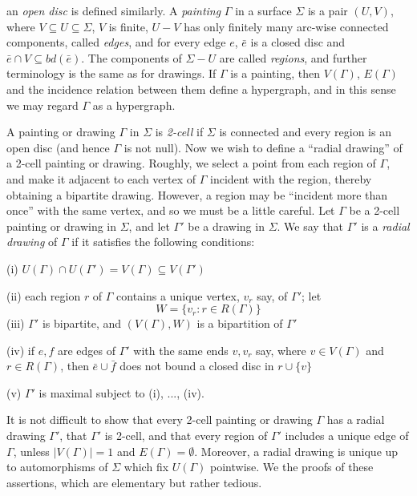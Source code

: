 \noindent an \textit{open disc} is defined similarly. A \textit{painting} $\Gamma$ in a surface $\Sigma$ is a pair $(U, V)$, where $V \subseteq U \subseteq \Sigma$, $V$ is finite, $U - V$ has only finitely many arc-wise connected components, called \textit{edges}, and for every edge $e$, $\bar{e}$ is a closed disc and $\bar{e} \cap V \subseteq bd(\bar{e})$. The components of $\Sigma - U$ are called \textit{regions}, and further terminology is the same as for drawings. If $\Gamma$ is a painting, then $V(\Gamma)$, $E(\Gamma)$ and the incidence relation between them define a hypergraph, and in this sense we may regard $\Gamma$ as a hypergraph.

A painting or drawing $\Gamma$ in $\Sigma$ is \textit{2-cell} if $\Sigma$ is connected and every region is an open disc (and hence $\Gamma$ is not null). Now we wish to define a ``radial drawing'' of a 2-cell painting or drawing. Roughly, we select a point from each region of $\Gamma$, and make it adjacent to each vertex of $\Gamma$ incident with the region, thereby obtaining a bipartite drawing. However, a region may be ``incident more than once'' with the same vertex, and so we must be a little careful. Let $\Gamma$ be a 2-cell painting or drawing in $\Sigma$, and let $\Gamma'$ be a drawing in $\Sigma$. We say that $\Gamma'$ is a \textit{radial drawing} of $\Gamma$ if it satisfies the following conditions:

\hspace*{12pt}(i) $U(\Gamma) \cap U(\Gamma') = V(\Gamma) \subseteq V(\Gamma')$

\hspace*{12pt}(ii) each region $r$ of $\Gamma$ contains a unique vertex, $v_r$ say, of $\Gamma'$; let
\begin{equation*}
W = \{v_r : r \in R(\Gamma)\}
\end{equation*}
\hspace*{12pt}(iii) $\Gamma'$ is bipartite, and $(V(\Gamma), W)$ is a bipartition of $\Gamma'$

\hspace*{12pt}(iv) if $e, f$ are edges of $\Gamma'$ with the same ends $v, v_r$ say, where $v \in V(\Gamma)$ and $r \in R(\Gamma)$, then $\bar{e} \cup \bar{f}$ does not bound a closed disc in $r \cup \{v\}$

\hspace*{12pt}(v) $\Gamma'$ is maximal subject to (i), ..., (iv).

It is not difficult to show that every 2-cell painting or drawing $\Gamma$ has a radial drawing $\Gamma'$, that $\Gamma'$ is 2-cell, and that every region of $\Gamma'$ includes a unique edge of $\Gamma$, unless $|V(\Gamma)| = 1$ and $E(\Gamma) = \emptyset$. Moreover, a radial drawing is unique up to automorphisms of $\Sigma$ which fix $U(\Gamma)$ pointwise. We  the proofs of  these assertions, which are elementary but rather tedious.

